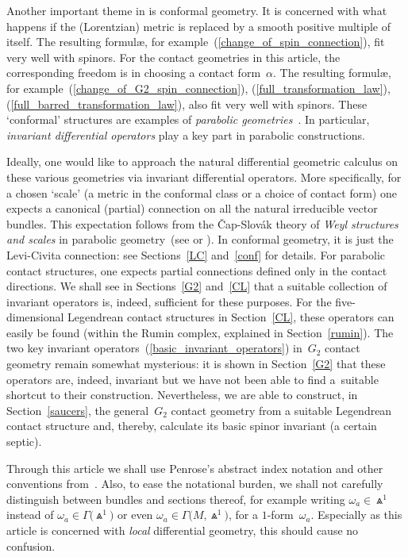 \documentclass[10pt,a4paper]{amsart}
\numberwithin{equation}{section}
\begin{document}
Another important theme in \cite{OT,NT} is conformal geometry. It is concerned
with what happens if the (Lorentzian) metric is replaced by a smooth positive
multiple of itself. The resulting formul{\ae}, for
example~(\ref{change_of_spin_connection}), fit very well with spinors. For the
contact geometries in this article, the corresponding freedom is in choosing a
contact form~$\alpha$. The resulting formul{\ae}, for
example~(\ref{change_of_G2_spin_connection}), (\ref{full_transformation_law}),
(\ref{full_barred_transformation_law}), also fit very well with spinors. These
`conformal' structures are examples of {\em parabolic geometries}~\cite{CS}.
In particular, {\em invariant differential operators} play a key part in
parabolic constructions.

Ideally, one would like to approach the natural differential geometric calculus
on these various geometries via invariant differential operators. More
specifically, for a chosen `scale' (a metric in the conformal class or a choice
of contact form) one expects a canonical (partial) connection on all the
natural irreducible vector bundles. This expectation follows from the
\v{C}ap-Slov\'ak theory of {\em Weyl structures and scales} in parabolic
geometry~(see \cite{CSweyl} or \cite[Section~5.1]{CS}). In conformal geometry, it is
just the Levi-Civita connection: see Sections~\ref{LC} and~\ref{conf} for details.
For parabolic contact structures, one expects partial connections defined only
in the contact directions. We shall see in Sections~\ref{G2} and~\ref{CL} that a
suitable collection of invariant operators is, indeed, sufficient for these
purposes. For the five-dimensional Legendrean contact structures
in Section~\ref{CL}, these operators can easily be found (within the Rumin complex,
explained in Section~\ref{rumin}). The two key invariant operators~(\ref{basic_invariant_operators}) in~$G_2$ contact geometry remain somewhat
mysterious: it is shown in Section~\ref{G2} that these operators are, indeed,
invariant but we have not been able to find a~suitable shortcut to their
construction. Nevertheless, we are able to construct, in Section~\ref{saucers}, the
general~$G_2$ contact geometry from a suitable Legendrean contact structure
and, thereby, calculate its basic spinor invariant (a certain septic).

Through this article we shall use Penrose's abstract index notation and other
conventions from~\cite{OT}. Also, to ease the notational burden, we shall not
carefully distinguish between bundles and sections thereof, for example writing
$\omega_a\in\Wedge^1$ instead of $\omega_a\in\Gamma\big({\Wedge}^1\big)$ or even
$\omega_a\in\Gamma\big(M,\Wedge^1\big)$, for a $1$-form~$\omega_a$. Especially as this
article is concerned with {\em local} differential geometry, this should
cause no confusion.
\end{document}
